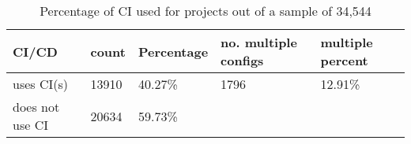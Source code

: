 
\begin{table}[!ht]
    \begin{tabular}{|l|l|l|l|l|}
    \hline
    CI/CD & \textbf{count} & \textbf{Percentage} & \textbf{no. multiple configs} & \textbf{multiple percent}   \\ \hline
    uses CI(s) & 13910     & 40.27\%             & 1796          & 12.91\%             \\ \hline
    does not use CI & 20634& 59.73\%             &             &             \\ \hline
    \end{tabular}
    \label{table:hilton_breakdown}
    \caption[Percentage of CI used for projects]{Percentage of CI used for projects out of a sample of 34,544}
\end{table}
            